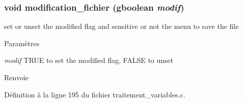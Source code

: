\subsubsection[{modification\_\-fichier}]{\setlength{\rightskip}{0pt plus 5cm}void modification\_\-fichier (gboolean {\em modif})}\label{traitement__variables_8h_aa4084b9e508b1d1fea1d09c6b6208021}
set or unset the modified flag and sensitive or not the menu to save the file


\begin{DoxyParams}{Paramètres}
\item[{\em modif}]TRUE to set the modified flag, FALSE to unset\end{DoxyParams}
\begin{DoxyReturn}{Renvoie}

\end{DoxyReturn}


Définition à la ligne 195 du fichier traitement\_\-variables.c.

